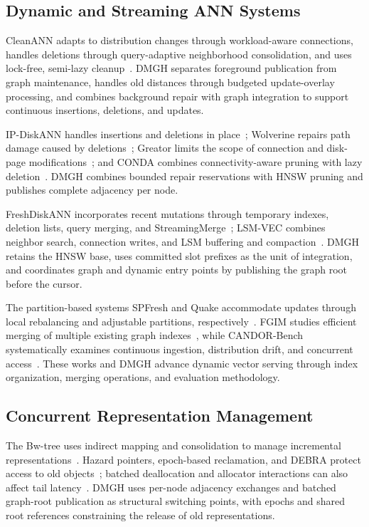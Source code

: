 \documentclass[sigconf,pbalance]{acmart}
\begin{document}
\subsection{Dynamic and Streaming ANN Systems}
\label{sec:related-dynamic}

CleanANN adapts to distribution changes through workload-aware connections, handles deletions through query-adaptive neighborhood consolidation, and uses lock-free, semi-lazy cleanup~\cite{zhang2026cleanann}. DMGH separates foreground publication from graph maintenance, handles old distances through budgeted update-overlay processing, and combines background repair with graph integration to support continuous insertions, deletions, and updates.

IP-DiskANN handles insertions and deletions in place~\cite{xu2025ipdiskann}; Wolverine repairs path damage caused by deletions~\cite{liu2025wolverine}; Greator limits the scope of connection and disk-page modifications~\cite{yu2025greator}; and CONDA combines connectivity-aware pruning with lazy deletion~\cite{lee2026conda}. DMGH combines bounded repair reservations with HNSW pruning and publishes complete adjacency per node.

FreshDiskANN incorporates recent mutations through temporary indexes, deletion lists, query merging, and StreamingMerge~\cite{singh2021freshdiskann}; LSM-VEC combines neighbor search, connection writes, and LSM buffering and compaction~\cite{zhong2025lsmvec,oneil1996lsm}. DMGH retains the HNSW base, uses committed slot prefixes as the unit of integration, and coordinates graph and dynamic entry points by publishing the graph root before the cursor.

The partition-based systems SPFresh and Quake accommodate updates through local rebalancing and adjustable partitions, respectively~\cite{xu2023spfresh,mohoney2025quake}. FGIM studies efficient merging of multiple existing graph indexes~\cite{wu2026fgim}, while CANDOR-Bench systematically examines continuous ingestion, distribution drift, and concurrent access~\cite{wang2026candor}. These works and DMGH advance dynamic vector serving through index organization, merging operations, and evaluation methodology.

\subsection{Concurrent Representation Management}
\label{sec:related-lifecycle}

The Bw-tree uses indirect mapping and consolidation to manage incremental representations~\cite{levandoski2013bwtree}. Hazard pointers, epoch-based reclamation, and DEBRA protect access to old objects~\cite{michael2004hazard,brown2015debra}; batched deallocation and allocator interactions can also affect tail latency~\cite{kim2024batchfree}. DMGH uses per-node adjacency exchanges and batched graph-root publication as structural switching points, with epochs and shared root references constraining the release of old representations.
\end{document}
